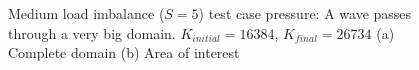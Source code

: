 \begin{figure}[H]
	\centering
	\hfill
	\caption{Medium load imbalance (\(S = 5\)) test case pressure: A wave passes through a very big domain. \(K_{initial} = 16384\), \(K_{final} = 26734\) (a) Complete domain (b) Area of interest}\label{fig:load_imbalance_case_medium_p}
\end{figure}

